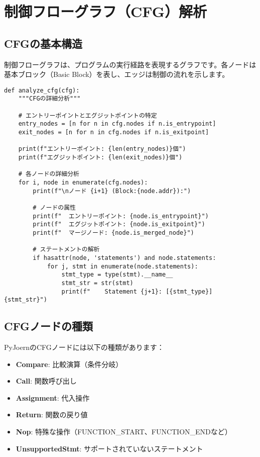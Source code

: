 \documentclass[12pt,a4paper]{article}
\begin{document}
\section{制御フローグラフ（CFG）解析}

\subsection{CFGの基本構造}

制御フローグラフは、プログラムの実行経路を表現するグラフです。各ノードは基本ブロック（Basic Block）を表し、エッジは制御の流れを示します。

\begin{lstlisting}[caption=CFGノードの詳細分析]
def analyze_cfg(cfg):
    """CFGの詳細分析"""

    # エントリーポイントとエグジットポイントの特定
    entry_nodes = [n for n in cfg.nodes if n.is_entrypoint]
    exit_nodes = [n for n in cfg.nodes if n.is_exitpoint]

    print(f"エントリーポイント: {len(entry_nodes)}個")
    print(f"エグジットポイント: {len(exit_nodes)}個")

    # 各ノードの詳細分析
    for i, node in enumerate(cfg.nodes):
        print(f"\nノード {i+1} (Block:{node.addr}):")

        # ノードの属性
        print(f"  エントリーポイント: {node.is_entrypoint}")
        print(f"  エグジットポイント: {node.is_exitpoint}")
        print(f"  マージノード: {node.is_merged_node}")

        # ステートメントの解析
        if hasattr(node, 'statements') and node.statements:
            for j, stmt in enumerate(node.statements):
                stmt_type = type(stmt).__name__
                stmt_str = str(stmt)
                print(f"    Statement {j+1}: [{stmt_type}] {stmt_str}")
\end{lstlisting}

\subsection{CFGノードの種類}

PyJoernのCFGノードには以下の種類があります：

\begin{itemize}
    \item \textbf{Compare}: 比較演算（条件分岐）
    \item \textbf{Call}: 関数呼び出し
    \item \textbf{Assignment}: 代入操作
    \item \textbf{Return}: 関数の戻り値
    \item \textbf{Nop}: 特殊な操作（FUNCTION\_START、FUNCTION\_ENDなど）
    \item \textbf{UnsupportedStmt}: サポートされていないステートメント
\end{itemize}
\end{document}
